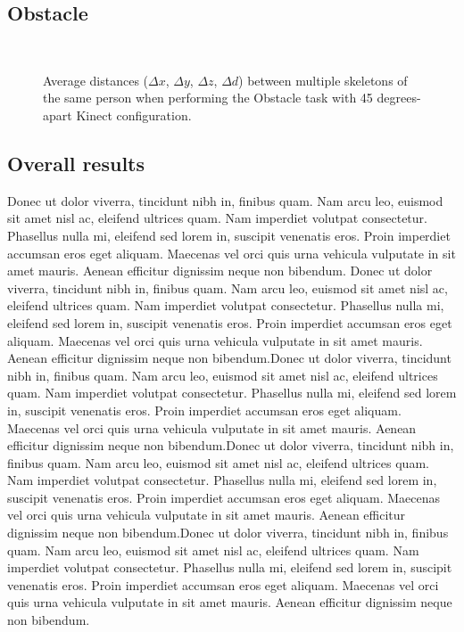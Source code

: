 \subsection{Obstacle}

\begin{figure*}
  \centering

  
   \\
  

  \caption{Average distances ($\Delta x$, $\Delta y$, $\Delta z$, $\Delta d$) between multiple skeletons
    of the same person when performing the Obstacle task with 45 degrees-apart Kinect configuration.}

  \label{fig:results_obstacle}
\end{figure*}

\subsection{Overall results}

Donec ut dolor viverra, tincidunt nibh in, finibus quam. Nam arcu leo, euismod sit amet nisl ac, eleifend ultrices quam. Nam imperdiet volutpat consectetur. Phasellus nulla mi, eleifend sed lorem in, suscipit venenatis eros. Proin imperdiet accumsan eros eget aliquam. Maecenas vel orci quis urna vehicula vulputate in sit amet mauris. Aenean efficitur dignissim neque non bibendum.
Donec ut dolor viverra, tincidunt nibh in, finibus quam. Nam arcu leo, euismod sit amet nisl ac, eleifend ultrices quam. Nam imperdiet volutpat consectetur. Phasellus nulla mi, eleifend sed lorem in, suscipit venenatis eros. Proin imperdiet accumsan eros eget aliquam. Maecenas vel orci quis urna vehicula vulputate in sit amet mauris. Aenean efficitur dignissim neque non bibendum.Donec ut dolor viverra, tincidunt nibh in, finibus quam. Nam arcu leo, euismod sit amet nisl ac, eleifend ultrices quam. Nam imperdiet volutpat consectetur. Phasellus nulla mi, eleifend sed lorem in, suscipit venenatis eros. Proin imperdiet accumsan eros eget aliquam. Maecenas vel orci quis urna vehicula vulputate in sit amet mauris. Aenean efficitur dignissim neque non bibendum.Donec ut dolor viverra, tincidunt nibh in, finibus quam. Nam arcu leo, euismod sit amet nisl ac, eleifend ultrices quam. Nam imperdiet volutpat consectetur. Phasellus nulla mi, eleifend sed lorem in, suscipit venenatis eros. Proin imperdiet accumsan eros eget aliquam. Maecenas vel orci quis urna vehicula vulputate in sit amet mauris. Aenean efficitur dignissim neque non bibendum.Donec ut dolor viverra, tincidunt nibh in, finibus quam. Nam arcu leo, euismod sit amet nisl ac, eleifend ultrices quam. Nam imperdiet volutpat consectetur. Phasellus nulla mi, eleifend sed lorem in, suscipit venenatis eros. Proin imperdiet accumsan eros eget aliquam. Maecenas vel orci quis urna vehicula vulputate in sit amet mauris. Aenean efficitur dignissim neque non bibendum.

